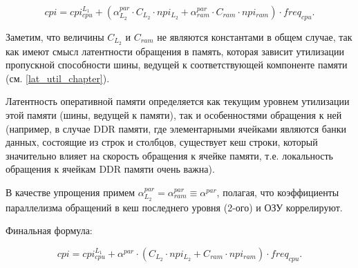     \begin{equation}
        cpi = cpi_{cpu}^{L_1} +
        \left( \alpha_{L_2}^{par} \cdot C_{L_2} \cdot npi_{L_2} +
               \alpha_{ram}^{par} \cdot C_{ram} \cdot npi_{ram} \right) \cdot freq_{cpu}.
    \end{equation}

    Заметим, что величины $C_{L_2}$ и $C_{ram}$ не являются константами в общем случае, так как
    имеют смысл латентности обращения в память, которая зависит утилизации пропускной способности
    шины, ведущей к соответствующей компоненте памяти (см. \ref{lat_util_chapter}).

    Латентность оперативной памяти определяется как текущим уровнем утилизации этой памяти
    (шины, ведущей к памяти), так и особенностями обращения к ней (например, в случае DDR
    памяти, где элементарными ячейками являются банки данных, состоящие из строк и столбцов,
    существует кеш строки, который значительно влияет на скорость обращения
    к ячейке памяти, т.е. локальность обращения к ячейкам DDR памяти очень важна).

    В качестве упрощения примем $\alpha_{L_2}^{par} = \alpha_{ram}^{par} \equiv \alpha^{par}$, полагая,
    что коэффициенты параллелизма обращений в кеш последнего уровня (2-ого) и ОЗУ коррелируют.

    Финальная формула:

    \begin{equation} \label{cpi_formula}
        cpi = cpi_{cpu}^{L_1} + \alpha^{par} \cdot
        \left( C_{L_2} \cdot npi_{L_2} + C_{ram} \cdot npi_{ram} \right) \cdot freq_{cpu}.
    \end{equation}

